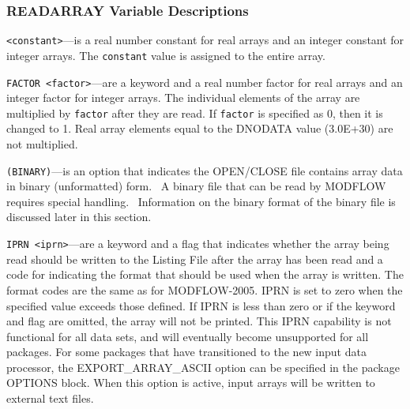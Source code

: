 \subsubsection{READARRAY Variable Descriptions}

\begin{description}

\item \texttt{<constant>}---is a real number constant for real arrays and an integer constant for integer arrays. The \texttt{constant} value is assigned to the entire array. 

\item \texttt{FACTOR <factor>}---are a keyword and a real number factor for real arrays and an integer factor for integer arrays. The individual elements of the array are multiplied by \texttt{factor} after they are read. If \texttt{factor} is specified as 0, then it is changed to 1. Real array elements equal to the DNODATA value (3.0E+30) are not multiplied.

\item \texttt{(BINARY)}---is an option that indicates the OPEN/CLOSE file contains array data in binary (unformatted) form.  A binary file that can be read by MODFLOW requires special handling.  Information on the binary format of the binary file is discussed later in this section.

\item \texttt{IPRN <iprn>}---are a keyword and a flag that indicates whether the array being read should be written to the Listing File after the array has been read and a code for indicating the format that should be used when the array is written. The format codes are the same as for MODFLOW-2005. IPRN is set to zero when the specified value exceeds those defined. If IPRN is less than zero or if the keyword and flag are omitted, the array will not be printed.  This IPRN capability is not functional for all data sets, and will eventually become unsupported for all packages.  For some packages that have transitioned to the new input data processor, the EXPORT\_ARRAY\_ASCII option can be specified in the package OPTIONS block.  When this option is active, input arrays will be written to external text files.

\end{description}

